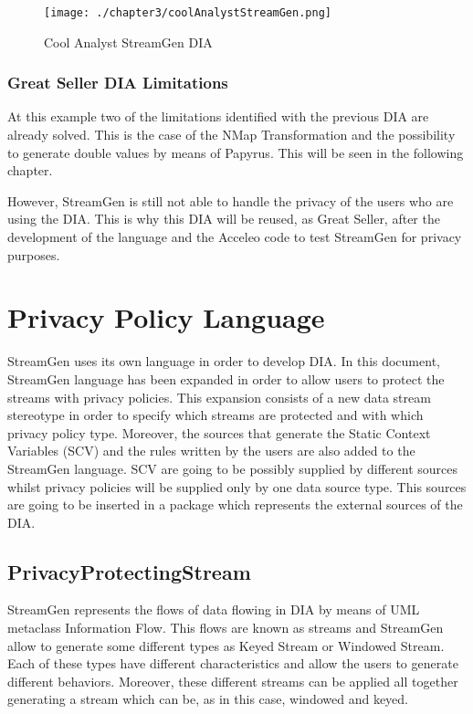 \begin{figure}
\centering
{\texttt{[image: ./chapter3/coolAnalystStreamGen.png]}}
\caption{Cool Analyst StreamGen DIA}
\label{fig:Cool Analyst StreamGen DIA}
\end{figure}

\subsubsection*{Great Seller DIA Limitations}

At this example two of the limitations identified with the previous DIA are already solved. This is the case of the NMap Transformation and the possibility to generate double values by means of Papyrus. This will be seen in the following chapter.

However, StreamGen is still not able to handle the privacy of the users who are using the DIA. This is why this DIA will be reused, as Great Seller, after the development of the language and the Acceleo code to test StreamGen for privacy purposes.

\section{Privacy Policy Language}

StreamGen uses its own language in order to develop DIA. In this document, StreamGen language has been expanded in order to allow users to protect the streams with privacy policies. This expansion consists of a new data stream stereotype in order to specify which streams are protected and with which privacy policy type. Moreover, the sources that generate the Static Context Variables (SCV) and the rules written by the users are also added to the StreamGen language. SCV are going to be possibly supplied by different sources whilst privacy policies will be supplied only by one data source type. This sources are going to be inserted in a package which represents the external sources of the DIA.

\subsection{PrivacyProtectingStream}

StreamGen represents the flows of data flowing in DIA by means of UML metaclass Information Flow. This flows are known as streams and StreamGen allow to generate some different types as Keyed Stream or Windowed Stream. Each of these types have different characteristics and allow the users to generate different behaviors. Moreover, these different streams can be applied all together generating a stream which can be, as in this case, windowed and keyed.

